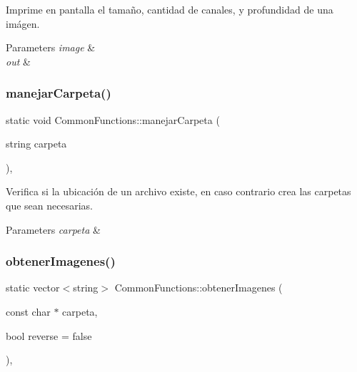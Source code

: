 Imprime en pantalla el tamaño, cantidad de canales, y profundidad de una imágen. 


\begin{DoxyParams}{Parameters}
{\em image} & \\
\hline
{\em out} & \\
\hline
\end{DoxyParams}
\mbox{\label{classCommonFunctions_a8f31532bc3dd60e5c95d40daaef7c705}} 
\subsubsection{\texorpdfstring{manejar\+Carpeta()}{manejarCarpeta()}}
{\footnotesize\ttfamily static void Common\+Functions\+::manejar\+Carpeta (\begin{DoxyParamCaption}\item[{string}]{carpeta }\end{DoxyParamCaption})\hspace{0.3cm}{\ttfamily [inline]}, {\ttfamily [static]}}



Verifica si la ubicación de un archivo existe, en caso contrario crea las carpetas que sean necesarias. 


\begin{DoxyParams}{Parameters}
{\em carpeta} & \\
\hline
\end{DoxyParams}
\mbox{\label{classCommonFunctions_a79ab98672a5297e53ea032a9ecf7ec02}} 
\subsubsection{\texorpdfstring{obtener\+Imagenes()}{obtenerImagenes()}}
{\footnotesize\ttfamily static vector$<$string$>$ Common\+Functions\+::obtener\+Imagenes (\begin{DoxyParamCaption}\item[{const char $\ast$}]{carpeta,  }\item[{bool}]{reverse = {\ttfamily false} }\end{DoxyParamCaption})\hspace{0.3cm}{\ttfamily [inline]}, {\ttfamily [static]}}



